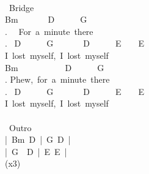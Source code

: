 {\\
\lbrack\ Bridge\rbrack\\
Bm\ \ \ \ \ \ \ D\ \ \ \ \ \ G\\
. \ \ For\ a\ minute\ there\\
. \ D\ \ \ \ \ \ G\ \ \ \ \ \ \ D\ \ \ \ \ \ E\ \ \ \ E\\
I\ lost\ myself,\ I\ lost\ myself\\
Bm\ \ \ \ \ \ \ \ \ \ \ D\ \ \ \ \ \ G\\
. Phew,\ for\ a\ minute\ there\\
. \ D\ \ \ \ \ \ G\ \ \ \ \ \ \ D\ \ \ \ \ \ E\ \ \ \ E\\
I\ lost\ myself,\ I\ lost\ myself\\
\\
\lbrack\ Outro\rbrack\\
|\ Bm\ D\ |\ G\ D\ |\\
|\ G\ \ D\ |\ E\ E\ |\\
(x3)}
